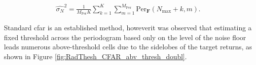 					\begin{align}
					\label{align: threshold_noise_power}
						\hat{\sigma_N}^2 = \frac{1}{M_{\text{Per}}K} \sum_{k=1}^K \sum_{m=1}^{M_{\text{Per}}} \text{Per}_{\bm{F}}(N_{\text{max}}+k, m).
					\end{align}
			
			Standard \gls{cfar} is an established method, howeverit was observed that estimating a fixed threshold across the periodogram based only on the level of the noise floor leads numerous above-threshold cells due to the sidelobes of the target returns, as shown in Figure \ref{fig:RadThesh_CFAR_abv_thresh_doubl}.
			
				\begin{figure}[H]
				\centering
				
				\hfill
				

\end{figure}
